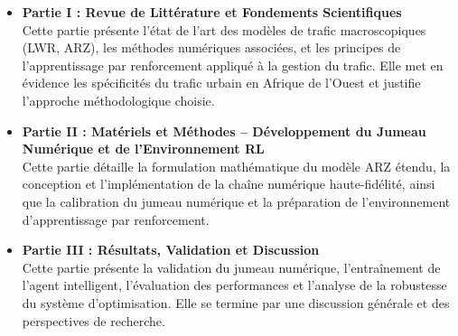 \begin{itemize}
    \item \textbf{Partie I : Revue de Littérature et Fondements Scientifiques} \\
          Cette partie présente l'état de l'art des modèles de trafic macroscopiques (LWR, ARZ), les méthodes numériques associées, et les principes de l'apprentissage par renforcement appliqué à la gestion du trafic. Elle met en évidence les spécificités du trafic urbain en Afrique de l'Ouest et justifie l'approche méthodologique choisie.

    \item \textbf{Partie II : Matériels et Méthodes – Développement du Jumeau Numérique et de l'Environnement RL} \\
          Cette partie détaille la formulation mathématique du modèle ARZ étendu, la conception et l'implémentation de la chaîne numérique haute-fidélité, ainsi que la calibration du jumeau numérique et la préparation de l'environnement d'apprentissage par renforcement.

    \item \textbf{Partie III : Résultats, Validation et Discussion} \\
          Cette partie présente la validation du jumeau numérique, l'entraînement de l'agent intelligent, l'évaluation des performances et l'analyse de la robustesse du système d'optimisation. Elle se termine par une discussion générale et des perspectives de recherche.
\end{itemize}

